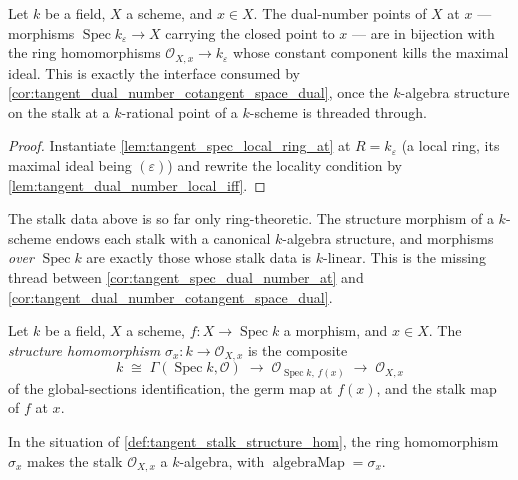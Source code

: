 \begin{corollary}\leanok
  \label{cor:tangent_spec_dual_number_at}
  Let \(k\) be a field, \(X\) a scheme, and \(x \in X\). The
  dual-number points of \(X\) at \(x\) — morphisms
  \(\operatorname{Spec} k_\varepsilon \to X\) carrying the closed point
  to \(x\) — are in bijection with the ring homomorphisms
  \(\mathcal O_{X,x} \to k_\varepsilon\) whose constant component kills
  the maximal ideal. This is exactly the interface consumed by
  \cref{cor:tangent_dual_number_cotangent_space_dual}, once the
  \(k\)-algebra structure on the stalk at a \(k\)-rational point of a
  \(k\)-scheme is threaded through.
\end{corollary}

\begin{proof}\leanok
  Instantiate \cref{lem:tangent_spec_local_ring_at} at
  \(R = k_\varepsilon\) (a local ring, its maximal ideal being
  \((\varepsilon)\)) and rewrite the locality condition by
  \cref{lem:tangent_dual_number_local_iff}.
\end{proof}

The stalk data above is so far only ring-theoretic. The structure
morphism of a \(k\)-scheme endows each stalk with a canonical
\(k\)-algebra structure, and morphisms \emph{over} \(\operatorname{Spec} k\)
are exactly those whose stalk data is \(k\)-linear. This is the missing
thread between \cref{cor:tangent_spec_dual_number_at} and
\cref{cor:tangent_dual_number_cotangent_space_dual}.

\begin{definition}\leanok
  \label{def:tangent_stalk_structure_hom}
  Let \(k\) be a field, \(X\) a scheme, \(f : X \to \operatorname{Spec} k\)
  a morphism, and \(x \in X\). The \emph{structure homomorphism}
  \(\sigma_x : k \to \mathcal O_{X,x}\) is the composite
  \[
    k \;\cong\; \Gamma(\operatorname{Spec} k, \mathcal O)
      \;\longrightarrow\; \mathcal O_{\operatorname{Spec} k,\, f(x)}
      \;\longrightarrow\; \mathcal O_{X,x}
  \]
  of the global-sections identification, the germ map at \(f(x)\), and
  the stalk map of \(f\) at \(x\).
\end{definition}

\begin{definition}\leanok
  \label{def:tangent_stalk_algebra}
  In the situation of \cref{def:tangent_stalk_structure_hom}, the ring
  homomorphism \(\sigma_x\) makes the stalk \(\mathcal O_{X,x}\) a
  \(k\)-algebra, with \(\operatorname{algebraMap} = \sigma_x\).
\end{definition}


